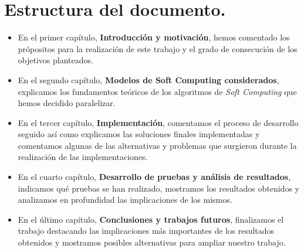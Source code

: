 \documentclass[a4paper,oneside,11pt,titlepage]{book}
\begin{document}
\section{Estructura del documento.}

\begin{itemize}
    \item En el primer capítulo, \textbf{Introducción y motivación}, hemos comentado los própositos para la realización de este trabajo y el grado de consecución de los objetivos planteados.
    \item En el segundo capítulo, \textbf{Modelos de Soft Computing considerados}, explicamos los fundamentos teóricos de los algoritmos de \textit{Soft Computing} que hemos decidido paralelizar.
    \item En el tercer capítulo, \textbf{Implementación}, comentamos el proceso de desarrollo seguido así como explicamos las soluciones finales implementadas y comentamos algunas de las alternativas y problemas que surgieron durante la realización de las implementaciones.
    \item En el cuarto capítulo, \textbf{Desarrollo de pruebas y análisis de resultados}, indicamos qué pruebas se han realizado, mostramos los resultados obtenidos y analizamos en profundidad las implicaciones de los mismos.
    \item En el último capítulo, \textbf{Conclusiones y trabajos futuros}, finalizamos el trabajo destacando las implicaciones más importantes de los resultados obtenidos y mostramos posibles alternativas para ampliar nuestro trabajo.
\end{itemize}

%




%
%
%
%
%
%
%
%
%
%
%
%
%
%
%
%
%
%
%
%
%
% 
 
%

%
%
%

\thispagestyle{empty}
\end{document}
